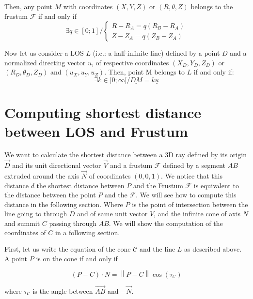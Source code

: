 \documentclass[a4paper,11pt,twoside,titlepage,openright]{book}
\numberwithin{equation}{section}
\newcommand{\ud}[1]{\underline{#1}}
\newcommand{\norm}[1]{\left\lVert#1\right\rVert}
\begin{document}
Then, any point $M$ with coordinates $(X,Y,Z)$ or $(R,\theta,Z)$ belongs to the frustum $\mathcal{F}$ if and only if
$$
\exists q \in [0;1] /
\left\{ \begin{array}{ll}
R-R_A = q(R_B-R_A)\\
Z-Z_A = q(Z_B-Z_A)
\end{array}\right.
$$


Now let us consider a LOS $L$ (i.e.: a half-infinite line) defined by a point $D$ and a normalized directing vector $u$, of respective coordinates $(X_D,Y_D,Z_D)$ or $(R_D,\theta_D,Z_D)$ and $(u_X,u_Y,u_Z)$.
Then, point M belongs to $L$ if and only if:
$$
\exists k \in [0;\infty[ / \ud{DM} = k\ud{u}
$$



\chapter{Computing shortest distance between LOS and Frustum}


We want to calculate the shortest distance between a 3D ray defined by its origin $\vec{D}$ and its unit directional vector $\vec{V}$ and a frustum $\mathcal{F}$ defined by a segment $AB$ extruded around the axis $\vec{N}$ of coordinates $(0,0,1)$.
We notice that this distance $d$ the shortest distance between $P$ and the Frustum $\mathcal{F}$ is equivalent to the distance between the point $P$ and the $\mathcal{F}$. We will see how to compute this distance in the following section.
Where $P$ is the point of intersection between the line going to through $D$ and of same unit vector $V$, and the infinite cone of axis $N$ and summit $C$ passing through $AB$. We will show the computation of the coordinates of $C$ in a following section.


\begin{figure}[h]
\end{figure}


First, let us write the equation of the cone $\mathcal{C}$ and the line $L$ as described above. A point $P$ is on the cone if and only if

$$(P-C) \cdot N = \norm{P-C} \cos(\tau_\mathcal{C})$$

where $\tau_\mathcal{C}$ is the angle between $\vec{AB}$ and $-\vec{N}$. 
\end{document}
